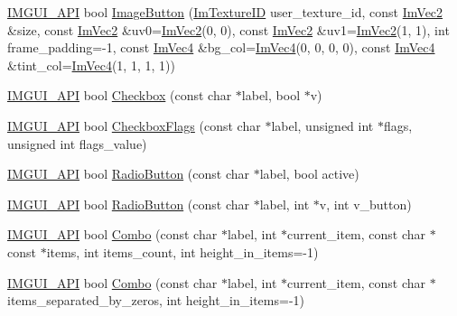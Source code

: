 \begin{DoxyCompactItemize}
\item 
\mbox{\hyperlink{imgui_8h_a43829975e84e45d1149597467a14bbf5}{I\+M\+G\+U\+I\+\_\+\+A\+PI}} bool \mbox{\hyperlink{namespace_im_gui_ac79ef64e8b9e1db73d8237f6a999da14}{Image\+Button}} (\mbox{\hyperlink{imgui_8h_a364f4447ecbc4ca176145ccff9db6286}{Im\+Texture\+ID}} user\+\_\+texture\+\_\+id, const \mbox{\hyperlink{struct_im_vec2}{Im\+Vec2}} \&size, const \mbox{\hyperlink{struct_im_vec2}{Im\+Vec2}} \&uv0=\mbox{\hyperlink{struct_im_vec2}{Im\+Vec2}}(0, 0), const \mbox{\hyperlink{struct_im_vec2}{Im\+Vec2}} \&uv1=\mbox{\hyperlink{struct_im_vec2}{Im\+Vec2}}(1, 1), int frame\+\_\+padding=-\/1, const \mbox{\hyperlink{struct_im_vec4}{Im\+Vec4}} \&bg\+\_\+col=\mbox{\hyperlink{struct_im_vec4}{Im\+Vec4}}(0, 0, 0, 0), const \mbox{\hyperlink{struct_im_vec4}{Im\+Vec4}} \&tint\+\_\+col=\mbox{\hyperlink{struct_im_vec4}{Im\+Vec4}}(1, 1, 1, 1))
\item 
\mbox{\hyperlink{imgui_8h_a43829975e84e45d1149597467a14bbf5}{I\+M\+G\+U\+I\+\_\+\+A\+PI}} bool \mbox{\hyperlink{namespace_im_gui_a57d73c1d0ef807fef734d91024092027}{Checkbox}} (const char $\ast$label, bool $\ast$v)
\item 
\mbox{\hyperlink{imgui_8h_a43829975e84e45d1149597467a14bbf5}{I\+M\+G\+U\+I\+\_\+\+A\+PI}} bool \mbox{\hyperlink{namespace_im_gui_aeca400dcf5a82c312b3e669d2fe6e88d}{Checkbox\+Flags}} (const char $\ast$label, unsigned int $\ast$flags, unsigned int flags\+\_\+value)
\item 
\mbox{\hyperlink{imgui_8h_a43829975e84e45d1149597467a14bbf5}{I\+M\+G\+U\+I\+\_\+\+A\+PI}} bool \mbox{\hyperlink{namespace_im_gui_a6b146763845cbad5a4144772279631bc}{Radio\+Button}} (const char $\ast$label, bool active)
\item 
\mbox{\hyperlink{imgui_8h_a43829975e84e45d1149597467a14bbf5}{I\+M\+G\+U\+I\+\_\+\+A\+PI}} bool \mbox{\hyperlink{namespace_im_gui_a018d2b61d2f00bb7a9dd2b1f933b93a5}{Radio\+Button}} (const char $\ast$label, int $\ast$v, int v\+\_\+button)
\item 
\mbox{\hyperlink{imgui_8h_a43829975e84e45d1149597467a14bbf5}{I\+M\+G\+U\+I\+\_\+\+A\+PI}} bool \mbox{\hyperlink{namespace_im_gui_ae801624ec02dac3b2b03321fffd91f1a}{Combo}} (const char $\ast$label, int $\ast$current\+\_\+item, const char $\ast$const $\ast$items, int items\+\_\+count, int height\+\_\+in\+\_\+items=-\/1)
\item 
\mbox{\hyperlink{imgui_8h_a43829975e84e45d1149597467a14bbf5}{I\+M\+G\+U\+I\+\_\+\+A\+PI}} bool \mbox{\hyperlink{namespace_im_gui_ae80520312b19a7039b77d2bafcbda8e5}{Combo}} (const char $\ast$label, int $\ast$current\+\_\+item, const char $\ast$items\+\_\+separated\+\_\+by\+\_\+zeros, int height\+\_\+in\+\_\+items=-\/1)

\end{DoxyCompactItemize}
